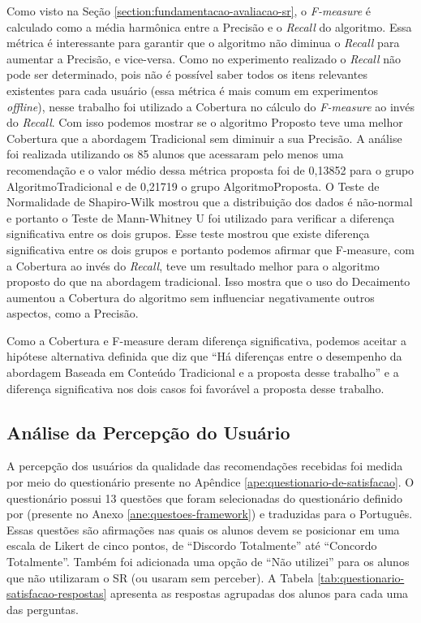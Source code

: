 Como visto na Seção \ref{section:fundamentacao-avaliacao-sr}, o \textit{F-measure} é calculado como a média harmônica entre
a Precisão e o \textit{Recall} do algoritmo. Essa métrica é interessante para garantir que o algoritmo não diminua o \textit{Recall}
para aumentar a Precisão, e vice-versa. Como no experimento realizado o \textit{Recall} não pode ser determinado, pois não
é possível saber todos os itens relevantes existentes para cada usuário (essa métrica é mais comum em experimentos
\textit{offline}), nesse trabalho foi utilizado a Cobertura no cálculo do \textit{F-measure} ao invés do \textit{Recall}.
Com isso podemos mostrar se o algoritmo Proposto teve uma melhor Cobertura que a abordagem Tradicional sem diminuir
a sua Precisão. A análise foi realizada utilizando os 85 alunos que acessaram pelo menos uma recomendação e o valor médio
dessa métrica proposta foi de 0,13852 para o grupo AlgoritmoTradicional e de 0,21719 o grupo AlgoritmoProposta.
O Teste de Normalidade de Shapiro-Wilk mostrou que a distribuição dos dados é não-normal e portanto o Teste de
Mann-Whitney U foi utilizado para verificar a diferença significativa entre os dois grupos. Esse teste mostrou que
existe diferença significativa entre os dois grupos e portanto podemos afirmar que F-measure, com a Cobertura ao invés
do \textit{Recall}, teve um resultado melhor para o algoritmo proposto do que na abordagem tradicional. Isso mostra
que o uso do Decaimento aumentou a Cobertura do algoritmo sem influenciar negativamente outros aspectos, como a Precisão.

Como a Cobertura e F-measure deram diferença significativa, podemos aceitar a hipótese alternativa definida
que diz que ``Há diferenças entre o desempenho da abordagem Baseada em Conteúdo Tradicional e a proposta desse trabalho''
e a diferença significativa nos dois casos foi favorável a proposta desse trabalho.

\subsection{Análise da Percepção do Usuário}\label{subsection:analise-questionario-satisfacao}

A percepção dos usuários da qualidade das recomendações recebidas foi medida por meio do questionário presente no
Apêndice \ref{ape:questionario-de-satisfacao}. O questionário possui 13 questões que foram selecionadas do questionário
definido por  (presente no Anexo \ref{ane:questoes-framework}) e traduzidas para o Português.
Essas questões são afirmações nas quais os alunos devem se posicionar em uma escala de
Likert de cinco pontos, de ``Discordo Totalmente'' até ``Concordo Totalmente''. Também foi adicionada uma opção de
``Não utilizei'' para os alunos que não utilizaram o SR (ou usaram sem perceber). A Tabela
\ref{tab:questionario-satisfacao-respostas} apresenta as respostas agrupadas dos alunos para cada uma das perguntas.


